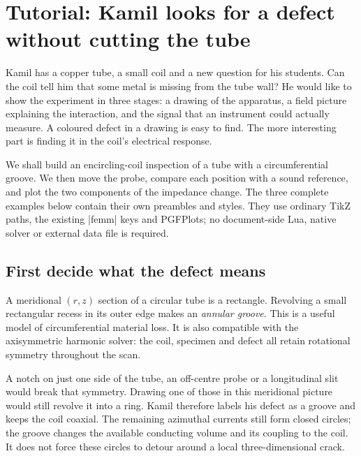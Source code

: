 \clearpage
\section{Tutorial: Kamil looks for a defect without cutting the tube}
\label{sec:tutorial-ndt}

Kamil has a copper tube, a small coil and a new question for his students.
Can the coil tell him that some metal is missing from the tube wall? He would
like to show the experiment in three stages: a drawing of the apparatus,
a field picture explaining the interaction, and the signal that an instrument
could actually measure. A coloured defect in a drawing is easy to find.
The more interesting part is finding it in the coil's electrical response.

We shall build an encircling-coil inspection of a tube with a circumferential
groove. We then move the probe, compare each position with a sound reference,
and plot the two components of the impedance change. The three complete
examples below contain their own preambles and styles. They use ordinary
TikZ paths, the existing |femm| keys and PGFPlots; no document-side Lua,
native solver or external data file is required.

\subsection{First decide what the defect means}
A meridional $(r,z)$ section of a circular tube is a rectangle. Revolving a
small rectangular recess in its outer edge makes an \emph{annular groove}.
This is a useful model of circumferential material loss. It is also compatible
with the axisymmetric harmonic solver: the coil, specimen and defect all
retain rotational symmetry throughout the scan.

A notch on just one side of the tube, an off-centre probe or a longitudinal
slit would break that symmetry. Drawing one of those in this meridional
picture would still revolve it into a ring. Kamil therefore labels his defect
as a groove and keeps the coil coaxial. The remaining azimuthal currents still
form closed circles; the groove changes the available conducting volume and
its coupling to the coil. It does not force these circles to detour around a
local three-dimensional crack.

